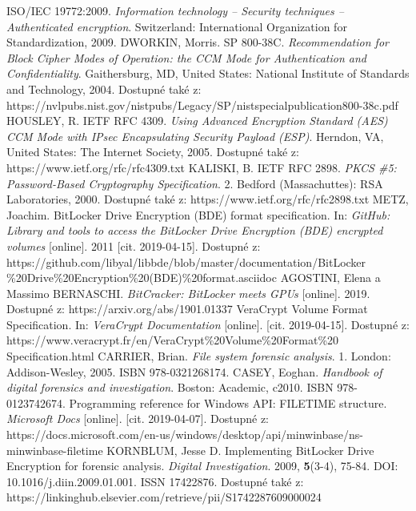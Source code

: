 \documentclass[a4paper,12pt]{article}
\begin{document}
{
ISO/IEC 19772:2009. \textit{Information technology -- Security techniques -- Authenticated encryption}. Switzerland: International Organization for Standardization, 2009.
DWORKIN, Morris. SP 800-38C. \textit{Recommendation for Block Cipher Modes of Operation: the CCM Mode for Authentication and Confidentiality}. Gaithersburg, MD, United States: National Institute of Standards and Technology, 2004. Dostupné také z: https://nvlpubs.nist.gov/nistpubs/Legacy/SP/nistspecialpublication800-38c.pdf
HOUSLEY, R. IETF RFC 4309. \textit{Using Advanced Encryption Standard (AES) CCM Mode with IPsec Encapsulating Security Payload (ESP)}. Herndon, VA, United States: The Internet Society, 2005. Dostupné také z: https://www.ietf.org/rfc/rfc4309.txt
KALISKI, B. IETF RFC 2898. \textit{PKCS \#5: Password-Based Cryptography Specification}. 2. Bedford (Massachuttes): RSA Laboratories, 2000. Dostupné také z: https://www.ietf.org/rfc/rfc2898.txt
METZ, Joachim. BitLocker Drive Encryption (BDE) format specification. In: \textit{GitHub: Library and tools to access the BitLocker Drive Encryption (BDE) encrypted volumes} [online]. 2011 [cit. 2019-04-15]. Dostupné z: https://github.com/libyal/libbde/blob/master/documentation/BitLocker\\\%20Drive\%20Encryption\%20(BDE)\%20format.asciidoc
AGOSTINI, Elena a Massimo BERNASCHI. \textit{BitCracker: BitLocker meets GPUs} [online]. 2019. Dostupné z: https://arxiv.org/abs/1901.01337
VeraCrypt Volume Format Specification. In: \textit{VeraCrypt Documentation} [online]. [cit. 2019-04-15]. Dostupné z: https://www.veracrypt.fr/en/VeraCrypt\%20Volume\%20Format\%20\\Specification.html
CARRIER, Brian. \textit{File system forensic analysis}. 1. London: Addison-Wesley, 2005. ISBN 978-0321268174.
CASEY, Eoghan. \textit{Handbook of digital forensics and investigation}. Boston: Academic, c2010. ISBN 978-0123742674.
Programming reference for Windows API: FILETIME structure. \textit{Microsoft Docs} [online]. [cit. 2019-04-07]. Dostupné z: https://docs.microsoft.com/en-us/windows/desktop/api/minwinbase/ns-minwinbase-filetime
KORNBLUM, Jesse D. Implementing BitLocker Drive Encryption for forensic analysis. \textit{Digital Investigation}. 2009, \textbf{5}(3-4), 75-84. DOI: 10.1016/j.diin.2009.01.001. ISSN 17422876. Dostupné také z: https://linkinghub.elsevier.com/retrieve/pii/S1742287609000024
}
\end{document}
